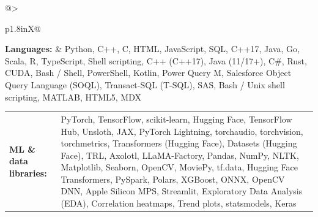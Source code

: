 \documentclass[letterpaper,11pt]{article}
\begin{document}
\begin{tabularx}{\linewidth}{@{}>{\raggedright\arraybackslash}p{1.8in}X@{}}
\textbf{Languages:} & \footnotesize{Python, C++, C, HTML, JavaScript, SQL, C++17, Java, Go, Scala, R, TypeScript, Shell scripting, C++ (C++17), Java (11/17+), C\#, Rust, CUDA, Bash / Shell, PowerShell, Kotlin, Power Query M, Salesforce Object Query Language (SOQL), Transact-SQL (T-SQL), SAS, Bash / Unix shell scripting, MATLAB, HTML5, MDX}\\
\end{tabularx}
\par\vspace{2pt}
\begin{tabularx}{\linewidth}{@{}>{\raggedright\arraybackslash}p{1.8in}X@{}}
\textbf{ML \& data libraries:} & \footnotesize{PyTorch, TensorFlow, scikit-learn, Hugging Face, TensorFlow Hub, Unsloth, JAX, PyTorch Lightning, torchaudio, torchvision, torchmetrics, Transformers (Hugging Face), Datasets (Hugging Face), TRL, Axolotl, LLaMA-Factory, Pandas, NumPy, NLTK, Matplotlib, Seaborn, OpenCV, MoviePy, tf.data, Hugging Face Transformers, PySpark, Polars, XGBoost, ONNX, OpenCV DNN, Apple Silicon MPS, Streamlit, Exploratory Data Analysis (EDA), Correlation heatmaps, Trend plots, statsmodels, Keras}\\
\end{tabularx}
\par\vspace{2pt}
\end{document}
